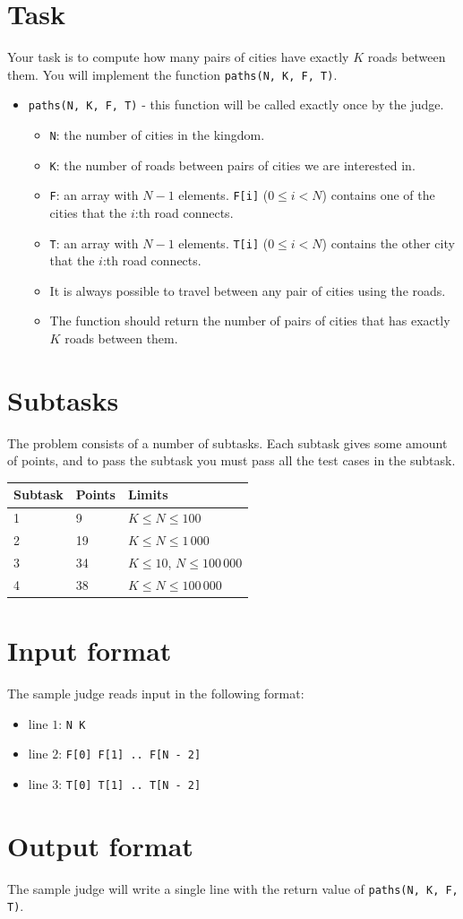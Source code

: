 \section*{Task}
Your task is to compute how many pairs of cities have exactly $K$ roads between them. You will implement the function \texttt{paths(N, K, F, T)}.
\begin{itemize}
  \item \texttt{paths(N, K, F, T)} - this function will be called exactly once by the judge.
  \begin{itemize}
    \item \texttt{N}: the number of cities in the kingdom.
    \item \texttt{K}: the number of roads between pairs of cities we are interested in.
    \item \texttt{F}: an array with $N - 1$ elements. \texttt{F[i]} ($0 \le i < N$) contains one of the cities that the $i$:th road connects.
    \item \texttt{T}: an array with $N - 1$ elements. \texttt{T[i]} ($0 \le i < N$) contains the other city that the $i$:th road connects.
    \item It is always possible to travel between any pair of cities using the roads.
    \item The function should return the number of pairs of cities that has exactly $K$ roads between them.
  \end{itemize}
\end{itemize}

\section*{Subtasks}
The problem consists of a number of subtasks. Each subtask gives some amount of points, and to pass
the subtask you must pass all the test cases in the subtask.

\begin{tabular}{|l|l|l|}
  \hline
  \textbf{Subtask} & \textbf{Points} & \textbf{Limits} \\ \hline
  1 & 9 & $K \le N \le 100$ \\ \hline
  2 & 19 & $K \le N \le 1\,000$ \\ \hline
  3 & 34 & $K \le 10$, $N \le 100\,000$ \\ \hline
  4 & 38 & $K \le N \le 100\,000$ \\ \hline
\end{tabular}

\section*{Input format}
The sample judge reads input in the following format:

\begin{itemize}
  \item line $1$: \texttt{N K}
  \item line $2$: \texttt{F[0] F[1] .. F[N - 2]}
  \item line $3$: \texttt{T[0] T[1] .. T[N - 2]}
\end{itemize}

\section*{Output format}
The sample judge will write a single line with the return value of \texttt{paths(N, K, F, T)}.
